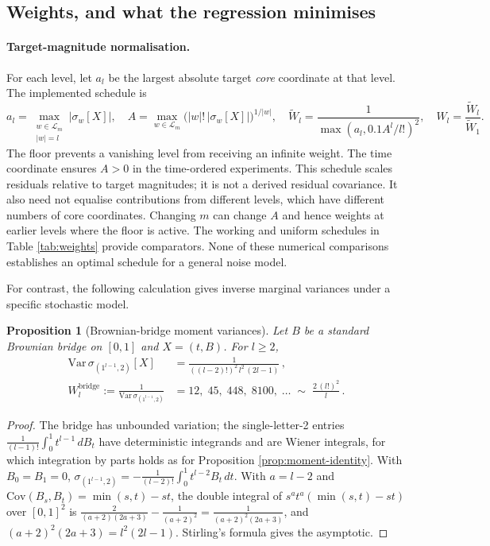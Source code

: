 \documentclass[11pt,english]{article}
\newtheorem{proposition}[theorem]{Proposition}
\theoremstyle{definition}
\theoremstyle{remark}
\begin{document}
\subsection{Weights, and what the regression minimises\label{subsec:Weights}}


\paragraph{Target-magnitude normalisation.}
For each level, let $a_l$ be the largest absolute target \emph{core}
coordinate at that level. The implemented schedule is
\begin{equation}
a_l=\max_{\substack{w\in\mathcal L_m\\|w|=l}}|\sigma_w[X]|,
\quad A=\max_{w\in\mathcal L_m}
\bigl(|w|!\,|\sigma_w[X]|\bigr)^{1/|w|},
\quad \widetilde W_l=\frac{1}{\max(a_l,0.1A^l/l!)^2},
\quad W_l=\frac{\widetilde W_l}{\widetilde W_1}.
\label{eq:variance-equalising}
\end{equation}
The floor prevents a vanishing level from receiving an infinite
weight. The time coordinate ensures $A>0$ in the time-ordered
experiments. This schedule scales residuals relative to target
magnitudes; it is not a derived residual covariance. It also need
not equalise contributions from different levels, which have
different numbers of core coordinates. Changing $m$ can change $A$
and hence weights at earlier levels where the floor is active.
The working and uniform schedules in Table \ref{tab:weights} provide
comparators. None of these numerical comparisons establishes an
optimal schedule for a general noise model.

For contrast, the following calculation gives inverse marginal
variances under a specific stochastic model.

\begin{proposition}[Brownian-bridge moment variances]
\label{prop:bridge}
Let $B$ be a standard Brownian bridge on $[0,1]$ and $X=(t,B)$. For
$l\geq2$,
\begin{align*}
\mathrm{Var}\,\sigma_{(1^{l-1},2)}[X] & =\frac{1}{((l-2)!)^{2}\,l^{2}\,(2l-1)}\,,\\
W_{l}^{\mathrm{bridge}}:=\frac{1}{\mathrm{Var}\,\sigma_{(1^{l-1},2)}} & =12,\;45,\;448,\;8100,\;\ldots\;\sim\;\frac{2\,(l!)^{2}}{l}\,.
\end{align*}
\end{proposition}

\begin{proof}
The bridge has unbounded variation; the single-letter-2 entries
$\frac{1}{(l-1)!}\int_{0}^{1}t^{l-1}\,dB_{t}$ have deterministic
integrands and are Wiener integrals, for which integration by parts
holds as for Proposition \ref{prop:moment-identity}. With $B_{0}=B_{1}=0$,
$\sigma_{(1^{l-1},2)}=-\frac{1}{(l-2)!}\int_{0}^{1}t^{l-2}B_{t}\,dt$.
With $a=l-2$ and $\mathrm{Cov}(B_{s},B_{t})=\min(s,t)-st$, the double
integral of $s^{a}t^{a}(\min(s,t)-st)$ over $[0,1]^{2}$ is
$\frac{2}{(a+2)(2a+3)}-\frac{1}{(a+2)^{2}}=\frac{1}{(a+2)^{2}(2a+3)}$,
and $(a+2)^{2}(2a+3)=l^{2}(2l-1)$. Stirling's formula gives the asymptotic.
\end{proof}
\end{document}
